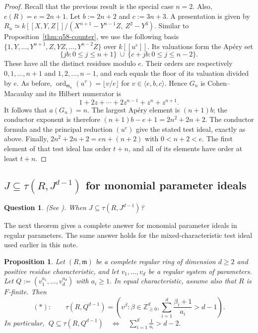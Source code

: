 \documentclass[11pt,a4paper]{amsart}
\numberwithin{equation}{section}
\newtheorem{proposition}[theorem]{Proposition}
\newtheorem{question}[theorem]{Question}
\newcommand{\mm}{\mathfrak m}
\newcommand{\NN}{\mathbb Z_{\geq0}}
\begin{document}
 \begin{proof}Recall that the previous result is the special case $n=2$. 	Also, 
 	$	e(R)=e=2n+1$. Let $ b:=2n+2$ and $c:=3n+3.$ 
 	A presentation is given by
 $R_n\simeq k[[X,Y,Z]]/
 	(X^{n+1}-Y^{n-1}Z,\ Z^2-Y^3).$
Similar to Proposition~\ref{thm:q58-counter}, we use the
 	following basis
 	$\{1,Y,\ldots,Y^{n+1}, Z,YZ,\ldots,Y^{n-2}Z\}$  over $k[[u^e]]$.
 	Its valuations form the Ap\'ery set
 	$$
 	\{jb:0\leq j\leq n+1\}
 	\ \cup\ \{c+jb:0\leq j\leq n-2\}.
 	$$
 	These have all the distinct residues modulo $e$.
 	Their orders are respectively $0,1,\ldots,n+1$ and
 	$1,2,\ldots,n-1$, and each equals the floor of its valuation
 	divided by $e$. As before,
 	$\operatorname{ord}_{\mm_n}(u^v)=\lfloor v/e\rfloor$ for
 	$v\in\langle e,b,c\rangle$. Hence $G_n$ is Cohen--Macaulay
 	and its Hilbert numerator is
 	$$
 	1+2z+\cdots+2z^{n-1}+z^n+z^{n+1}.
 	$$
 	It follows that $a(G_n)=n$.
 	The largest Ap\'ery element is $(n+1)b$; the conductor exponent
 	is therefore $(n+1)b-e+1=2n^2+2n+2$.
 	The conductor formula and the principal reduction $(u^e)$
 	give the stated test ideal, exactly as above. Finally,
 	$ 	2n^2+2n+2=en+(n+2)$ with $ 0<n+2<e.$
 	The first element of that test ideal has order $t+n$, and
 	all of its elements have order at least $t+n$.
 \end{proof}
 
 \subsection{ 
 	$J\subseteq\tau(R,J^{d-1})$  for monomial parameter ideals}
 \label{sec:q86}
 
  \begin{question}\label{eq:q86}   (See \cite[Question 8.6]{WY}).
 	When
 	$J\subseteq\tau(R,J^{d-1}) $?\end{question}
 
 The next theorem gives a complete answer for monomial parameter
 ideals in regular parameters. The same answer holds for the
 mixed-characteristic test ideal used earlier in this note.
 
 \begin{proposition}\label{thm:q86-monomial}
 	Let $(R,\mm)$ be a complete regular  ring of dimension
 	$d\geq2$ and positive residue characteristic, and let
 	$v_1,\ldots,v_d$ be a regular system of parameters. Let
 $Q:=(v_1^{a_1},\ldots,v_d^{a_d})$ with $ a_i\geq1.$
 	In equal characteristic, assume also that $R$ is $F$-finite.
 Then
$$(\ast):\quad \quad
 		\tau(R,Q^{d-1})=
 		\left(v^\beta:\beta\in\NN^d,             \sum_{i=1}^d\frac{\beta_i+1}{a_i}>d-1\right).$$
 	In particular,
${\ Q\subseteq\tau(R,Q^{d-1})
 		\quad\Longleftrightarrow\quad
 		\sum_{i=1}^d\frac1{a_i}>d-2.\ } $
 \end{proposition}
 
\end{document}
